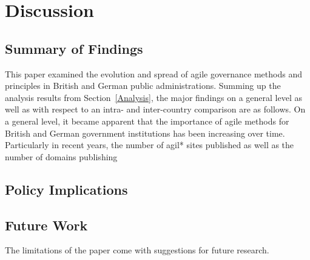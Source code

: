 \section{Discussion}
\subsection{Summary of Findings}
This paper examined the evolution and spread of agile governance methods and principles in British and German public administrations. Summing up the analysis results from Section~\ref{Analysis}, the major findings on a general level as well as with respect to an intra- and inter-country comparison are as follows. 
On a general level, it became apparent that the importance of agile methods for British and German government institutions has been increasing over time. Particularly in recent years, the number of agil* sites published as well as the number of domains publishing 


\subsection{Policy Implications}
\subsection{Future Work}
The limitations of the paper come with suggestions for future research. 







